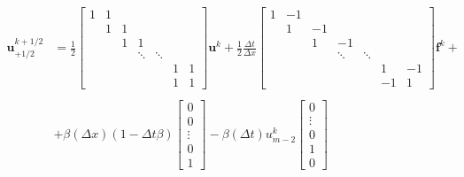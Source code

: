 \begin{subequations}
    \begin{equation}
        \label{eq:neumann_plus_flux}
        \begin{split}
            \mathbf{{u}}_{+1/2}^{k+1/2}&=\frac{1}{2}
            \begin{bmatrix}
                1 & 1 &   &        &        &   &   \\
                & 1 & 1 &        &        &   &   \\
                &   & 1 & 1      &        &   &   \\
                &   &   & \ddots & \ddots &   &   \\
                &   &   &        &        & 1 & 1 \\
                &   &   &        &        & 1 & 1
            \end{bmatrix}\mathbf{u}^k+
            \frac{1}{2}\frac{\Delta t}{\Delta x}
            \begin{bmatrix}
                1 & -1 &    &        &        &    &    \\
                & 1  & -1 &        &        &    &    \\
                &    & 1  & -1     &        &    &    \\
                &    &    & \ddots & \ddots &    &    \\
                &    &    &        &        & 1  & -1 \\
                &    &    &        &        & -1 & 1
            \end{bmatrix}\mathbf{f}^k+\\\\
            &+\beta(\Delta x)\left( 1-\Delta t \beta \right)
            \begin{bmatrix}
                0      \\
                0      \\
                \vdots \\
                0      \\
                1
            \end{bmatrix}-\beta (\Delta t)u_{m-2}^k
            \begin{bmatrix}
                0      \\
                \vdots \\
                0      \\
                1      \\
                0

\end{bmatrix}
\end{split}
\end{equation}
\end{subequations}

